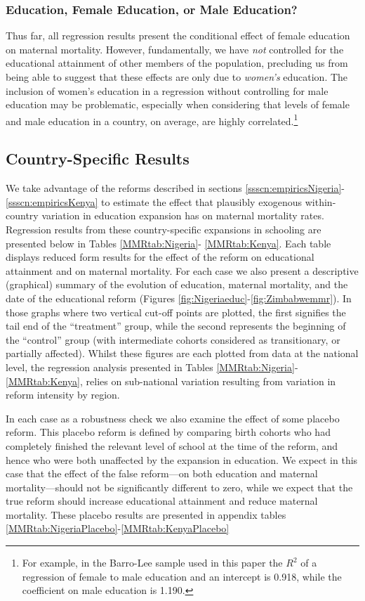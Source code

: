 \documentclass{article}[12pt,subeqn]
\begin{document}
\begin{spacing}{1.4}
\subsubsection{Education, Female Education, or Male Education?}
\label{ssscn:gender}
Thus far, all regression results present the conditional effect of female 
education on maternal mortality.  However, fundamentally, we have \emph{not} 
controlled for the educational attainment of other members of the population, 
precluding us from being able to suggest that these effects are only due to 
\emph{women's} education.  The inclusion of women's education in a regression 
without controlling for male education may be problematic, especially when 
considering that levels of female and male education in a country, on average, 
are highly correlated.\footnote{For example, in the Barro-Lee sample used in this 
paper the $R^2$ of a regression of female to male education and an intercept is 
0.918, while the coefficient on male education is 1.190.}

\subsection{Country-Specific Results}
We take advantage of the reforms described in sections 
\ref{ssscn:empiricsNigeria}-\ref{ssscn:empiricsKenya} to estimate the effect that 
plausibly exogenous within-country variation in education expansion has on 
maternal mortality rates. Regression results from these country-specific 
expansions in schooling are presented below in Tables \ref{MMRtab:Nigeria}-%
\ref{MMRtab:Kenya}. Each table displays reduced form results for the effect of 
the reform on educational attainment and on maternal mortality. For each case we 
also present a descriptive (graphical) summary of the evolution of education, 
maternal mortality, and the date of the educational reform (Figures 
\ref{fig:Nigeriaeduc}-\ref{fig:Zimbabwemmr}). In those graphs where two vertical 
cut-off points are plotted, the first signifies the tail end of the ``treatment'' 
group, while the second represents the beginning of the ``control'' group (with 
intermediate cohorts considered as transitionary, or partially affected). Whilst 
these figures are each plotted from data at the national level, the regression 
analysis presented in Tables \ref{MMRtab:Nigeria}-\ref{MMRtab:Kenya}, relies on 
sub-national variation resulting from variation in reform intensity by region. 

In each case as a robustness check we also examine the effect of some placebo 
reform. This placebo reform is defined by comparing birth cohorts who had 
completely finished the relevant level of school at the time of the reform, and 
hence who were both unaffected by the expansion in education.  We expect in this 
case that the effect of the false reform---on both education and maternal 
mortality---should not be significantly different to zero, while we expect that 
the true reform should increase educational attainment and reduce maternal 
mortality.  These placebo results are presented in appendix tables 
\ref{MMRtab:NigeriaPlacebo}-\ref{MMRtab:KenyaPlacebo}


\end{spacing}
\end{document}
